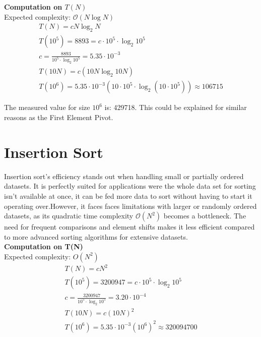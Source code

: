 \documentclass{article}
\begin{document}
\textbf{Computation on $T(N)$}\\
Expected complexity: $\mathcal{O}(N \log N)$\\

\[
\begin{gathered}
    T(N) = cN \log_2 N \\
    T(10^5) = 8893 = c \cdot 10^5 \cdot \log_2 10^5 \\
    c = \frac{8893}{10^5 \cdot \log_2 10^5} = 5.35 \cdot 10^{-3} \\
    T(10N) = c(10N \log_2 10N) \\
    T(10^6) = 5.35 \cdot 10^{-3}(10 \cdot 10^5 \cdot \log_2 (10 \cdot 10^5)) \approx 106715
\end{gathered}
\]

The measured value for size $10^6$ is: 429718. This could be explained for similar reasons as the First Element Pivot.

\newpage
\section{Insertion Sort}

Insertion sort's efficiency stands out when handling small or partially ordered datasets. It is perfectly suited for applications were the whole data set for sorting isn't available at once, it can be fed more data to sort without having to start it operating over.However, it faces faces limitations with larger or randomly ordered datasets, as its quadratic time complexity $\mathcal{O}(N^2)$ becomes a bottleneck. The need for frequent comparisons and element shifts makes it less efficient compared to more advanced sorting algorithms for extensive datasets. \\

\textbf{Computation on T(N)}\\

Expected complexity: $O(N^2)$\\

\[
\begin{gathered}
    T(N) = cN^2 \\
    T(10^5) = 3200947 = c \cdot 10^5 \cdot \log_2 10^5 \\
    c = \frac{3200947}{10^5 \cdot \log_2 10^5} = 3.20 \cdot 10^{-4} \\
    T(10N) = c(10N)^2 \\
    T(10^6) = 5.35 \cdot 10^{-3}(10^6)^2 \approx 320094700
\end{gathered}
\]
\end{document}
